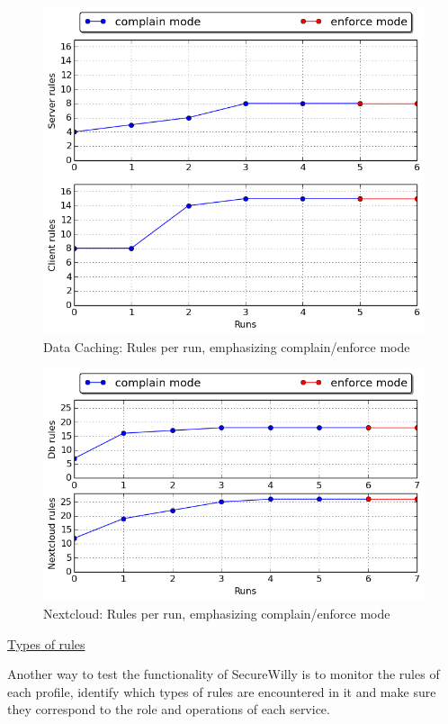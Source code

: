 \hfill\break

\begin{figure}[h!]
  \centering
   \includegraphics[width=0.75\linewidth]{../figures/datacaching/complain_enforce_rules.png}
   \caption{Data Caching: Rules per run, emphasizing complain/enforce mode}
\end{figure}

\begin{figure}[h!]
  \centering
   \includegraphics[width=0.75\linewidth]{../figures/nextcloud/complain_enforce_rules.png}
   \caption{Nextcloud: Rules per run, emphasizing complain/enforce mode}
\end{figure}
\hfill\break
\hfill\break
\underline{Types of rules}
\hfill\break

Another way to test the functionality of SecureWilly is to monitor the rules of each profile, identify which types of rules are encountered in it and make sure they correspond to the role and operations of each service.

